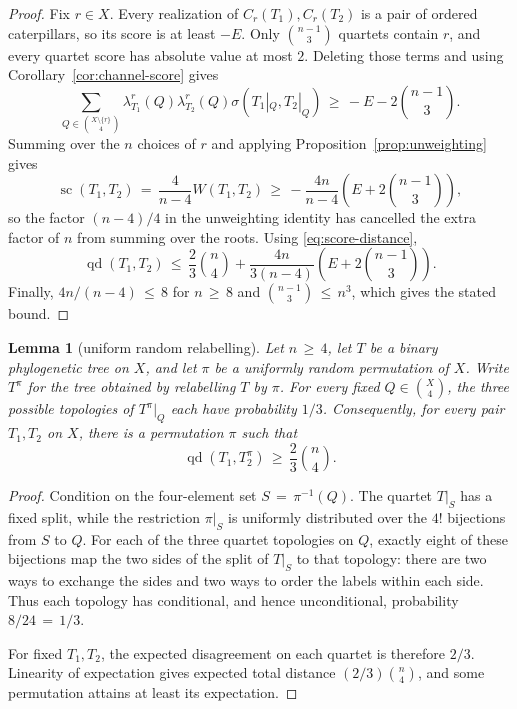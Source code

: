 \documentclass[11pt]{article}
\newtheorem{lemma}[theorem]{Lemma}
\theoremstyle{definition}
\newcommand{\qd}{\operatorname{qd}}
\newcommand{\score}{\operatorname{sc}}
\begin{document}
\begin{proof}
Fix $r\in X$.  Every realization of $C_r(T_1),C_r(T_2)$ is a pair of
ordered caterpillars, so its score is at least $-E$.  Only
$\binom{n-1}{3}$ quartets contain $r$, and every quartet score has
absolute value at most $2$.  Deleting those terms and using
Corollary~\ref{cor:channel-score} gives
\begin{equation}\label{eq:fixed-root}
 \sum_{Q\in\binom{X\setminus\{r\}}4}
 \lambda_{T_1}^r(Q)\lambda_{T_2}^r(Q)
 \sigma(T_1|_Q,T_2|_Q)
 \,\geq\,-E-2\binom{n-1}{3}.
\end{equation}
Summing over the $n$ choices of $r$ and applying
Proposition~\ref{prop:unweighting} gives
\[
 \score(T_1,T_2)\,=\,\frac4{n-4}W(T_1,T_2)
 \,\geq\,-\frac{4n}{n-4}
   \left(E+2\binom{n-1}{3}\right),
\]
so the factor $(n-4)/4$ in the unweighting identity has cancelled the
extra factor of $n$ from summing over the roots.  Using
\eqref{eq:score-distance},
\[
 \qd(T_1,T_2)
 \,\leq\,\frac23\binom n4+
   \frac{4n}{3(n-4)}\left(E+2\binom{n-1}{3}\right).
\]
Finally, $4n/(n-4)\,\leq\,8$ for $n\,\geq\,8$ and
$\binom{n-1}{3}\,\leq\,n^3$, which gives the stated bound.
\end{proof}

\begin{lemma}[uniform random relabelling]\label{lem:random-relabeling}
Let $n\,\geq\,4$, let $T$ be a binary phylogenetic tree on $X$, and let
$\pi$ be a uniformly random permutation of $X$.  Write $T^\pi$ for the
tree obtained by relabelling $T$ by $\pi$.  For every fixed
$Q\in\binom X4$, the three possible topologies of $T^\pi|_Q$ each have
probability $1/3$.  Consequently, for every pair $T_1,T_2$ on $X$,
there is a permutation $\pi$ such that
\[
 \qd(T_1,T_2^\pi)\,\geq\,\frac23\binom n4.
\]
\end{lemma}

\begin{proof}
Condition on the four-element set $S\,=\,\pi^{-1}(Q)$.  The quartet
$T|_S$ has a fixed split, while the restriction $\pi|_S$ is uniformly
distributed over the $4!$ bijections from $S$ to $Q$.  For each of the
three quartet topologies on $Q$, exactly eight of these bijections map the
two sides of the split of $T|_S$ to that topology: there are two ways to
exchange the sides and two ways to order the labels within each side.
Thus each topology has conditional, and hence unconditional, probability
$8/24\,=\,1/3$.

For fixed $T_1,T_2$, the expected disagreement on each quartet is
therefore $2/3$.  Linearity of expectation gives expected total distance
$(2/3)\binom n4$, and some permutation attains at least its expectation.
\end{proof}
\end{document}
